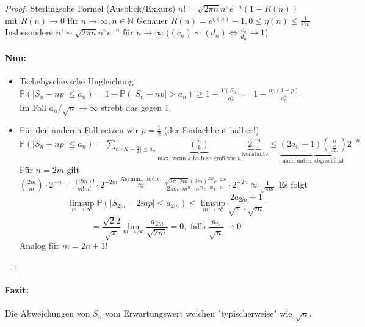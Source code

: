 \documentclass[a4paper,11pt,notitlepage]{report}
\newcommand{\N}{{\ensuremath{\mathbb{N}}}}
\newcommand{\Prim}{{\ensuremath{\mathbb{P}}}}
\begin{document}
\begin{proof}
	Sterlingsche Formel (Ausblick/Exkurs)
	\newline
	$n! = \sqrt{2 \pi n} n^n e^{-n} (1 + R(n))$ mit $R(n) \rightarrow 0$ für $n \rightarrow \infty, n \in \N$
	\newline
	Genauer $R(n) = e^{\eta(n)} - 1, 0 \leq \eta(n) \leq \frac{1}{12n}$
	\newline
	Insbesondere $n! \sim \sqrt{2 \pi n} n^n e^{-n}$ für $n \rightarrow \infty$
	\newline
	($(c_n) \sim (d_n) \Leftrightarrow \frac{c_n}{d_n} \rightarrow 1$)

\paragraph{Nun:}
\begin{itemize}
	\item Tschebyschevsche Ungleichung
	\newline
	$\Prim(|S_n - n p | \leq a_n) = 1 - \Prim(|S_n - n p | > a_n) \geq 1 - \frac{V(S_n)}{a_n^2} = 1 - \frac{n p (1-p)}{a_n^2}$
	\newline
	Im Fall $a_n/\sqrt{n} \rightarrow \infty$ strebt das gegen $1$.
	\item Für den anderen Fall setzen wir $p= \frac{1}{2}$ (der Einfachheut halber!)
	\newline
	$\Prim(|S_n - np| \leq a_n) = \sum\limits_{n \colon |K - \frac{n}{2}| \leq a_n} \underbrace{{n \choose k}}_{\text{max. wenn $k$ halb so groß wie $n$}} \underbrace{2^{-n}}_{\text{Konstante}} \leq \underbrace{(2 a_n + 1){n \choose \lfloor \frac{n}{2} \rfloor}}_{\text{nach unten abgeschätzt}} 2^{-n}$
	\newline
	Für $n = 2m$ gilt ${2m \choose m} \cdot 2^{-n} = \frac{(2m)!}{m!m!} \cdot 2^{-2m} \overset{\text{Asymm., äquiv.}}{\approx} \frac{\sqrt{2 \pi \cdot 2m} (2m)^{2m} e^{-2m}}{2 \pi m \cdot m^n \cdot m^m e^{-m} e^{-m}} \cdot 2^{-2n} \approx \frac{1}{\sqrt{\pi m}}$
	\newline
	Es folgt 
	$$\limsup_{m \rightarrow \infty} {\Prim(|S_{2m}-2mp| \leq a_{2m})} \leq \limsup_{m \rightarrow \infty} {\frac{2 a_{2m} +1}{\sqrt{\pi} \cdot \sqrt{m}}}$$
	$$= \frac{\sqrt{2}2}{\sqrt{\pi}} \lim_{m \rightarrow \infty}{\frac{a_{2m}}{\sqrt{2m}}} = 0, \text{ falls } \frac{a_n}{\sqrt{n}} \rightarrow 0$$
	Analog für $m = 2n+1$!
\end{itemize}
\end{proof}

\paragraph{Fazit:}
Die Abweichungen von $S_n$ vom Erwartungswert weichen "typischerweise" wie $\sqrt{n}$.
\end{document}
